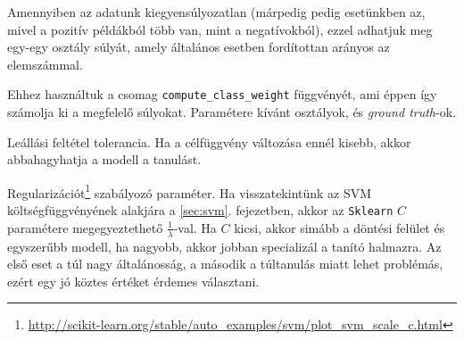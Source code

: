 
Amennyiben az adatunk kiegyensúlyozatlan (márpedig pedig esetünkben az, mivel a pozitív példákból több van, mint a negatívokból), ezzel adhatjuk meg
 egy-egy osztály súlyát, amely általános esetben fordítottan arányos az elemszámmal.

Ehhez használtuk a csomag \texttt{compute\_class\_weight} függvényét, ami éppen így számolja ki a megfelelő súlyokat.
Paramétere  kívánt osztályok, és \textit{ground truth}-ok.



Leállási feltétel tolerancia. Ha a célfüggvény változása ennél kisebb, akkor abbahagyhatja a modell a tanulást.





%
%

Regularizációt\footnote{\url{http://scikit-learn.org/stable/auto_examples/svm/plot_svm_scale_c.html}} szabályozó paraméter. Ha visszatekintünk az SVM költségfüggvényének alakjára a \ref{sec:svm}. fejezetben, akkor az \texttt{Sklearn} $ C $ paramétere megegyeztethető $ \frac{1}{\lambda} $-val.
Ha $ C $ kicsi, akkor simább a döntési felület és egyszerűbb modell, ha nagyobb, akkor 
jobban specializál a tanító halmazra. Az első eset a túl nagy általánosság, a második a túltanulás
miatt lehet problémás, ezért egy jó köztes értéket érdemes választani.



